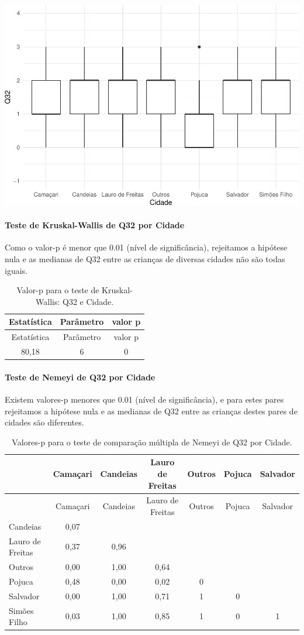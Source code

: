 \documentclass[]{article}
\let\oldparagraph\paragraph
\renewcommand{\paragraph}[1]{\oldparagraph{#1}\mbox{}}
\begin{document}
\begin{center}\includegraphics[width=0.75\linewidth]{relatorio_covid19_files/figure-latex/unnamed-chunk-1080-1} \end{center}

\hypertarget{teste-de-kruskal-wallis-de-q32-por-cidade}{%
\paragraph{Teste de Kruskal-Wallis de Q32 por Cidade}\label{teste-de-kruskal-wallis-de-q32-por-cidade}}

Como o valor-p é menor que 0.01 (nível de significância), rejeitamos a hipótese nula e as medianas de Q32 entre as crianças de diversas cidades não são todas iguais.

\begin{longtable}[]{@{}ccc@{}}
\caption{\label{tab:unnamed-chunk-1082}Valor-p para o teste de Kruskal-Wallis: Q32 e Cidade.}\tabularnewline
\toprule
Estatística & Parâmetro & valor p\tabularnewline
\midrule
\endfirsthead
\toprule
Estatística & Parâmetro & valor p\tabularnewline
\midrule
\endhead
80,18 & 6 & 0\tabularnewline
\bottomrule
\end{longtable}

\hypertarget{teste-de-nemeyi-de-q32-por-cidade}{%
\paragraph{Teste de Nemeyi de Q32 por Cidade}\label{teste-de-nemeyi-de-q32-por-cidade}}

Existem valores-p menores que 0.01 (nível de significância), e para estes pares rejeitamos a hipótese nula e as medianas de Q32 entre as crianças destes pares de cidades são diferentes.

\begin{longtable}[]{@{}lcccccc@{}}
\caption{\label{tab:unnamed-chunk-1084}Valores-p para o teste de comparação múltipla de Nemeyi de Q32 por Cidade.}\tabularnewline
\toprule
& Camaçari & Candeias & Lauro de Freitas & Outros & Pojuca & Salvador\tabularnewline
\midrule
\endfirsthead
\toprule
& Camaçari & Candeias & Lauro de Freitas & Outros & Pojuca & Salvador\tabularnewline
\midrule
\endhead
Candeias & 0,07 & & & & &\tabularnewline
Lauro de Freitas & 0,37 & 0,96 & & & &\tabularnewline
Outros & 0,00 & 1,00 & 0,64 & & &\tabularnewline
Pojuca & 0,48 & 0,00 & 0,02 & 0 & &\tabularnewline
Salvador & 0,00 & 1,00 & 0,71 & 1 & 0 &\tabularnewline
Simões Filho & 0,03 & 1,00 & 0,85 & 1 & 0 & 1\tabularnewline
\bottomrule
\end{longtable}
\end{document}
